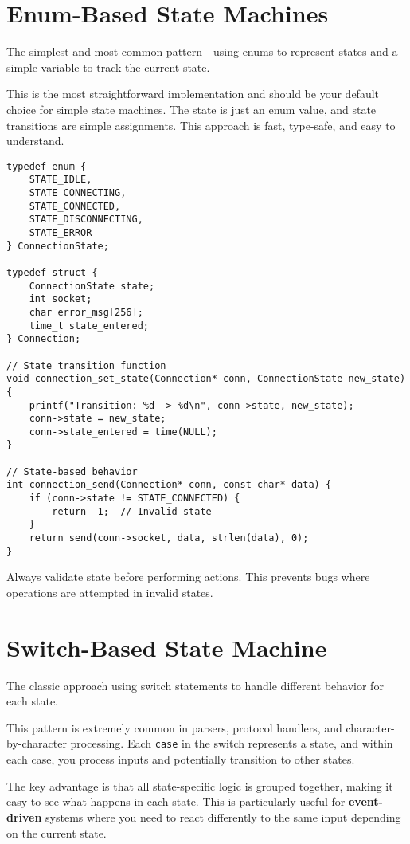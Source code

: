 \section{Enum-Based State Machines}

The simplest and most common pattern—using enums to represent states and a simple variable to track the current state.

This is the most straightforward implementation and should be your default choice for simple state machines. The state is just an enum value, and state transitions are simple assignments. This approach is fast, type-safe, and easy to understand.

\begin{lstlisting}
typedef enum {
    STATE_IDLE,
    STATE_CONNECTING,
    STATE_CONNECTED,
    STATE_DISCONNECTING,
    STATE_ERROR
} ConnectionState;

typedef struct {
    ConnectionState state;
    int socket;
    char error_msg[256];
    time_t state_entered;
} Connection;

// State transition function
void connection_set_state(Connection* conn, ConnectionState new_state) {
    printf("Transition: %d -> %d\n", conn->state, new_state);
    conn->state = new_state;
    conn->state_entered = time(NULL);
}

// State-based behavior
int connection_send(Connection* conn, const char* data) {
    if (conn->state != STATE_CONNECTED) {
        return -1;  // Invalid state
    }
    return send(conn->socket, data, strlen(data), 0);
}
\end{lstlisting}

\begin{tipbox}
Always validate state before performing actions. This prevents bugs where operations are attempted in invalid states.
\end{tipbox}

\section{Switch-Based State Machine}

The classic approach using switch statements to handle different behavior for each state.

This pattern is extremely common in parsers, protocol handlers, and character-by-character processing. Each \texttt{case} in the switch represents a state, and within each case, you process inputs and potentially transition to other states.

The key advantage is that all state-specific logic is grouped together, making it easy to see what happens in each state. This is particularly useful for \textbf{event-driven} systems where you need to react differently to the same input depending on the current state.

